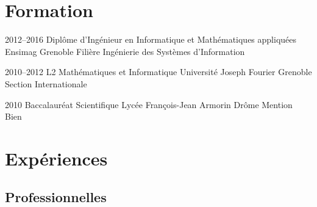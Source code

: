 \documentclass[11pt,a4paper,sans]{moderncv} %
\title{}
\begin{document}
\makecvtitle %
\vspace*{-0.75cm}

\section{Formation}
\cventry
    {2012--2016}
    {Diplôme d'Ingénieur en Informatique et Mathématiques appliquées}
    {}
    {Ensimag}
    {Grenoble}
    {Filière Ingénierie des Systèmes d'Information}
    
\cventry
    {2010--2012}
    {L2 Mathématiques et Informatique}
    {}
    {Université Joseph Fourier}
    {Grenoble}
    {Section Internationale}
    
\cventry
    {2010}
    {Baccalauréat Scientifique}
    {}
    {Lycée François-Jean Armorin}
    {Drôme}
    {Mention Bien}


\section{Expériences}

\subsection{Professionnelles}
\end{document}
